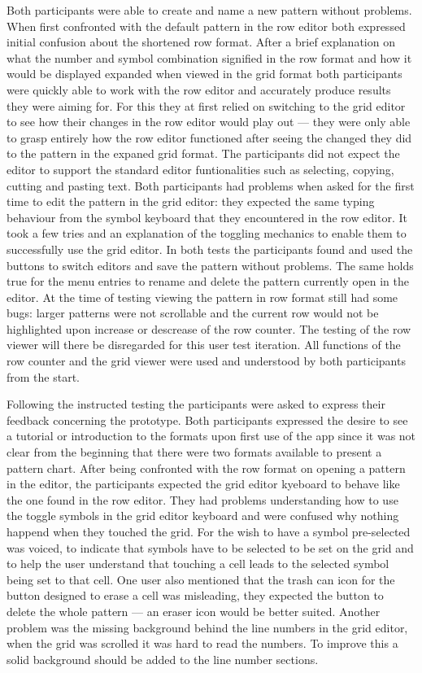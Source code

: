 Both participants were able to create and name a new pattern without problems. When first confronted with the default pattern in the row editor both expressed initial confusion about the shortened row format. After a brief explanation on what the number and symbol combination signified in the row format and how it would be displayed expanded when viewed in the grid format both participants were quickly able to work with the row editor and accurately produce results they were aiming for. For this they at first relied on switching to the grid editor to see how their changes in the row editor would play out --- they were only able to grasp entirely how the row editor functioned after seeing the changed they did to the pattern in the expaned grid format. The participants did not expect the editor to support the standard editor funtionalities such as selecting, copying, cutting and pasting text. 
Both participants had problems when asked for the first time to edit the pattern in the grid editor: they expected the same typing behaviour from the symbol keyboard that they encountered in the row editor. It took a few tries and an explanation of the toggling mechanics to enable them to successfully use the grid editor. In both tests the participants found and used the buttons to switch editors and save the pattern without problems. The same holds true for the menu entries to rename and delete the pattern currently open in the editor.
At the time of testing viewing the pattern in row format still had some bugs: larger patterns were not scrollable and the current row would not be highlighted upon increase or descrease of the row counter. The testing of the row viewer will there be disregarded for this user test iteration. All functions of the row counter and the grid viewer were used and understood by both participants from the start. 

Following the instructed testing the participants were asked to express their feedback concerning the prototype. Both participants expressed the desire to see a tutorial or introduction to the formats upon first use of the app since it was not clear from the beginning that there were two formats available to present a pattern chart. After being confronted with the row format on opening a pattern in the editor, the participants expected the grid editor kyeboard to behave like the one found in the row editor. They had problems understanding how to use the toggle symbols in the grid editor keyboard and were confused why nothing happend when they touched the grid. For the wish to have a symbol pre-selected was voiced, to indicate that symbols have to be selected to be set on the grid and to help the user understand that touching a cell leads to the selected symbol being set to that cell. One user also mentioned that the trash can icon for the button designed to erase a cell was misleading, they expected the button to delete the whole pattern --- an eraser icon would be better suited. Another problem was the missing background behind the line numbers in the grid editor, when the grid was scrolled it was hard to read the numbers. To improve this a solid background should be added to the line number sections. 

